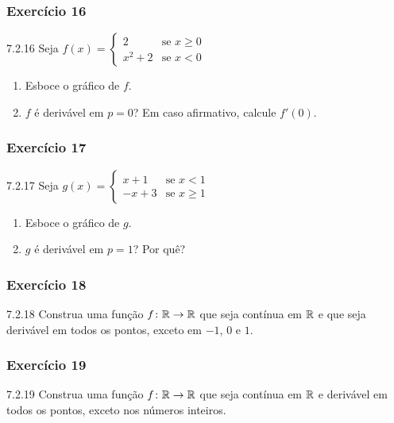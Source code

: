 \subsubsection*{Exercício 16}
\begin{exercicio}[16]{7.2.16}
Seja $f(x) = \begin{cases} 2 & \text{se } x \ge 0 \\ x^2 + 2 & \text{se } x < 0 \end{cases}$
\begin{enumerate}[label=\alph*)]
    \item Esboce o gráfico de $f$.
    \item $f$ é derivável em $p = 0$? Em caso afirmativo, calcule $f'(0)$.
\end{enumerate}
\end{exercicio}

\subsubsection*{Exercício 17}
\begin{exercicio}[17]{7.2.17}
Seja $g(x) = \begin{cases} x + 1 & \text{se } x < 1 \\ -x + 3 & \text{se } x \ge 1 \end{cases}$
\begin{enumerate}[label=\alph*)]
    \item Esboce o gráfico de $g$.
    \item $g$ é derivável em $p = 1$? Por quê?
\end{enumerate}
\end{exercicio}

\subsubsection*{Exercício 18}
\begin{exercicio}[18]{7.2.18}
Construa uma função $f\colon \mathbb{R} \to \mathbb{R}$ que seja contínua em $\mathbb{R}$ e que seja derivável em todos os pontos, exceto em $-1$, $0$ e $1$.
\end{exercicio}

\subsubsection*{Exercício 19}
\begin{exercicio}[19]{7.2.19}
Construa uma função $f\colon \mathbb{R} \to \mathbb{R}$ que seja contínua em $\mathbb{R}$ e derivável em todos os pontos, exceto nos números inteiros.
\end{exercicio}


